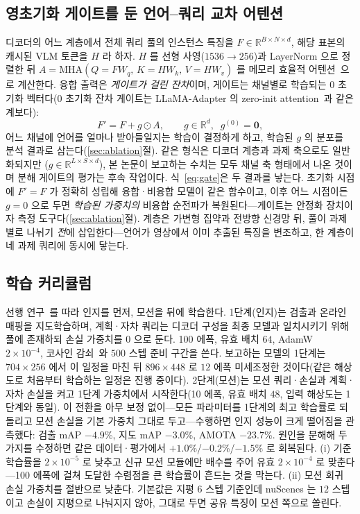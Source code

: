\documentclass[conference]{IEEEtran}
\newcommand{\measured}[1]{#1}
\begin{document}
\subsection{영초기화 게이트를 둔 언어--쿼리 교차 어텐션}
디코더의 어느 계층에서 전체 쿼리 풀의 인스턴스 특징을
$F \in \mathbb{R}^{B \times N \times d}$, 해당 표본의 캐시된 VLM 토큰을 $H$ 라 하자.
$H$ 를 선형 사영($1536\!\to\!256$)과 LayerNorm 으로 정렬한 뒤 $A = \mathrm{MHA}(Q{=}FW_q,\, K{=}HW_k,\, V{=}HW_v)$ 를 메모리 효율적
어텐션~\cite{dao2022flashattention}으로 계산한다. 융합 출력은 \emph{게이트가 걸린
잔차}이며, 게이트는 채널별로 학습되는 0 초기화 벡터다(0 초기화 잔차 게이트는
LLaMA-Adapter 의 zero-init attention~\cite{llamaadapter2023}과 같은 계보다):
\begin{equation}
  F' = F + g \odot A, \qquad
  g \in \mathbb{R}^{d},\;\; g^{(0)} = \mathbf{0},
  \label{eq:gate}
\end{equation}
어느 채널에 언어를 얼마나 받아들일지는 학습이 결정하게 하고, 학습된 $g$ 의 분포를 분석
결과로 삼는다(\ref{sec:ablation}절). 같은 형식은 디코더 계층과 과제 축으로도 일반화되지만
($g \in \mathbb{R}^{L\times S\times d}$), 본 논문이 보고하는 수치는 모두 채널 축 형태에서
나온 것이며 분해 게이트의 평가는 후속 작업이다. 식~\eqref{eq:gate}은 두 결과를 낳는다.
초기화 시점에 $F' = F$ 가 정확히 성립해 융합·비융합 모델이 같은 함수이고, 이후 어느
시점이든 $g{=}0$ 으로 두면 \emph{학습된 가중치의} 비융합 순전파가 복원된다---게이트는
안정화 장치이자 측정 도구다(\ref{sec:ablation}절). 계층은 가변형 집약과 전방향 신경망
뒤, 풀이 과제별로 나뉘기 \emph{전}에 삽입한다---언어가 영상에서 이미 추출된 특징을 변조하고, 한
계층이 네 과제 쿼리에 동시에 닿는다.

\subsection{학습 커리큘럼}
선행 연구~\cite{sun2024sparsedrive,hipad2025}를 따라 인지를 먼저, 모션을 뒤에 학습한다.
1단계(인지)는 검출과 온라인 매핑을 지도학습하며, 계획·자차 쿼리는 디코더 구성을
최종 모델과 일치시키기 위해 풀에 존재하되 손실 가중치를 0 으로 둔다. 100 에폭, 유효 배치
$64$, AdamW~\cite{loshchilov2019adamw} $2\!\times\!10^{-4}$, 코사인
감쇠~\cite{loshchilov2017sgdr}와 $500$ 스텝 준비 구간을 쓴다. 보고하는 모델의 1단계는
$704\!\times\!256$ 에서 이 일정을 마친 뒤 $896\!\times\!448$ 로 $12$ 에폭 미세조정한
것이다(같은 해상도로 처음부터 학습하는 일정은 진행 중이다). 2단계(모션)는
모션 쿼리·손실과 계획·자차 손실을 켜고 1단계 가중치에서 시작한다(10 에폭, 유효 배치
$48$, 입력 해상도는 1단계와 동일). 이 전환을 아무 보정 없이---모든 파라미터를 1단계의 최고 학습률로 되돌리고 모션 손실을
기본 가중치 그대로 두고---수행하면 인지 성능이 크게 떨어짐을 관측했다: 검출 mAP \measured{$-4.9$}\%, 지도 mAP
\measured{$-3.0$}\%, AMOTA \measured{$-23.7$}\%. 원인을 분해해 두 가지를 수정하면
같은 데이터·평가에서 \measured{$+1.0$}\%/\measured{$-0.2$}\%/\measured{$-1.5$}\% 로
회복된다. (i) 기준 학습률을 $2\!\times\!10^{-5}$ 로 낮추고 신규 모션 모듈에만 배수를 주어
유효 $2\!\times\!10^{-4}$ 로 맞춘다---100 에폭에 걸쳐 도달한 수렴점을 큰 학습률이 흔드는
것을 막는다. (ii) 모션 회귀 손실 가중치를 절반으로 낮춘다. 기본값은 지평 $6$ 스텝 기준인데
nuScenes 는 $12$ 스텝이고 손실이 지평으로 나눠지지 않아, 그대로 두면 공유 특징이 모션
쪽으로 쏠린다.
\end{document}

